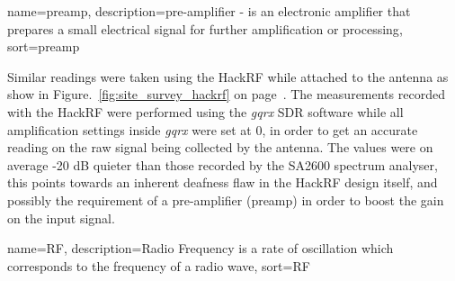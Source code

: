 {
  name={preamp},
  description={pre-amplifier - is an electronic amplifier that prepares a small electrical signal for further amplification or processing},
  sort=preamp
}

Similar readings were taken using the HackRF while attached to the antenna as show in Figure.~\ref{fig:site_survey_hackrf} on page~\pageref{fig:site_survey_hackrf}. The measurements recorded with the HackRF were performed using the \textit{gqrx} \gls{SDR} software while all amplification settings inside \textit{gqrx} were set at 0, in order to get an accurate reading on the raw signal being collected by the antenna. The values were on average -20 dB quieter than those recorded by the SA2600 spectrum analyser, this points towards an inherent deafness flaw in the HackRF design itself, and possibly the requirement of a pre-amplifier (\gls{preamp}) in order to boost the gain on the input signal. 

{
  name={RF},
  description={Radio Frequency is a rate of oscillation which corresponds to the frequency of a radio wave},
  sort=RF
}

